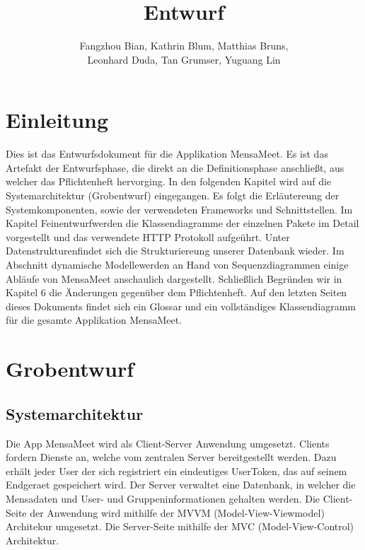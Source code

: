 \documentclass[a4paper]{scrreprt}
\begin{document}
\title{Entwurf}
\author{Fangzhou Bian, Kathrin Blum, Matthias Bruns, \\Leonhard Duda, Tan Grumser, Yuguang Lin}
\maketitle
\tableofcontents



\chapter{Einleitung}

Dies ist das Entwurfsdokument für die Applikation \dq MensaMeet\dq.  Es ist das Artefakt der Entwurfsphase, die direkt an die Definitionsphase anschließt, aus welcher das Pflichtenheft hervorging.
In den folgenden Kapitel wird auf die \Gls{Systemarchitektur} (\dq Grobentwurf\dq) eingegangen. Es folgt die Erläutereung der \Gls{Systemkomponenten}, sowie der verwendeten Frameworks und Schnittstellen. Im Kapitel \dq Feinentwurf\dq werden die Klassendiagramme der einzelnen Pakete im Detail vorgestellt und das verwendete HTTP Protokoll aufgeührt. Unter \dq Datenstrukturen\dq findet sich die Strukturiereung unserer Datenbank wieder. 
Im Abschnitt \dq dynamische Modelle\dq werden an Hand von Sequenzdiagrammen einige Abläufe von MensaMeet anschaulich dargestellt.
Schließlich Begründen wir in Kapitel 6 die Änderungen gegenüber dem Pflichtenheft.
Auf den letzten Seiten dieses Dokuments findet sich ein Glossar und ein vollständiges Klassendiagramm für die gesamte Applikation MensaMeet.




\chapter{Grobentwurf}
\section{Systemarchitektur}
Die App MensaMeet wird als Client-Server Anwendung umgesetzt. Clients fordern Dienste an, welche vom zentralen Server bereitgestellt werden. Dazu erhält jeder User der sich registriert ein eindeutiges UserToken, das auf seinem \Gls{Endgeraet} gespeichert wird. Der Server verwaltet eine Datenbank, in welcher die \Gls{Mensadaten} und User- und Gruppeninformationen gehalten werden. 
Die Client-Seite der Anwendung wird mithilfe der MVVM (Model-View-Viewmodel) Architekur umgesetzt.
Die Server-Seite mithilfe der MVC (Model-View-Control) Architektur.
\end{document}
